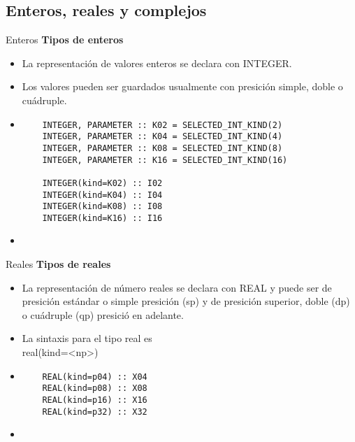 
\subsection{Enteros, reales y complejos}

\begin{frame}[fragile]{Enteros}
\textbf{Tipos de enteros}
 \begin{itemize}[<+(0)->]
  \item La representación de valores enteros se declara con INTEGER.
  \item Los valores pueden ser guardados usualmente con presición simple, doble o cuádruple.  \item []
   \begin{verbatim} 
    INTEGER, PARAMETER :: K02 = SELECTED_INT_KIND(2)
    INTEGER, PARAMETER :: K04 = SELECTED_INT_KIND(4)
    INTEGER, PARAMETER :: K08 = SELECTED_INT_KIND(8)
    INTEGER, PARAMETER :: K16 = SELECTED_INT_KIND(16)

    INTEGER(kind=K02) :: I02
    INTEGER(kind=K04) :: I04
    INTEGER(kind=K08) :: I08
    INTEGER(kind=K16) :: I16
   \end{verbatim}
  \item[] 
 \end{itemize}
\end{frame}

\begin{frame}[fragile]{Reales}
\textbf{Tipos de reales}
 \begin{itemize}[<+(1)->]
  \item La representación de número reales se declara con REAL y puede ser de presición estándar o simple presición (sp) y de presición superior, doble (dp) o cuádruple (qp) presició en adelante.
  \item La sintaxis para el tipo real es\\ 
   \centering real(kind=<np>)
  \vspace{6pt}
  \item []
   \begin{verbatim}
    REAL(kind=p04) :: X04
    REAL(kind=p08) :: X08
    REAL(kind=p16) :: X16
    REAL(kind=p32) :: X32
   \end{verbatim}
  \item[] 
 \end{itemize}
\end{frame}


